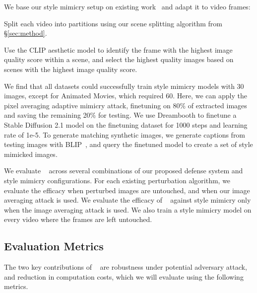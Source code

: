   We base our style mimicry setup on existing
work~\cite{mist,shan2023glaze,shan2023prompt,antidb} and adapt it to video
frames:
\begin{packed_enumerate}
\item Split each video into partitions using our scene splitting algorithm from \S\ref{sec:method}.
\item Use the CLIP aesthetic model to identify the frame with the highest image quality score within a scene, and select the highest quality images based on scenes with the highest image quality score.
\end{packed_enumerate}
    
We find that all datasets could successfully train style mimicry models with
30 images, except for Animated Movies, which required 60. Here, we can apply the pixel 
averaging adaptive mimicry attack, finetuning on 80\% of extracted images
and saving the remaining 20\% for testing. We use Dreambooth to
finetune a Stable Diffusion 2.1 model on the finetuning dataset for 1000
steps and learning rate of 1e-5. To generate matching synthetic images, we
generate captions from testing images with BLIP~\cite{li2022blip}, and query
the finetuned model to create a set of style mimicked images. 

We evaluate \system~ across several combinations of our proposed defense
system and style mimicry configurations. For each existing perturbation
algorithm, we evaluate the efficacy when perturbed images are untouched, and
when our image averaging attack is used. We evaluate the efficacy of \system~
against style mimicry only when the image averaging attack is used. We also
train a style mimicry model on every video where the frames are left
untouched.

\subsection{Evaluation Metrics}
\label{sec:eval-metrics}
The two key contributions of \system~ are robustness under potential
adversary attack, and reduction in computation costs, which we will evaluate
using the following metrics.

